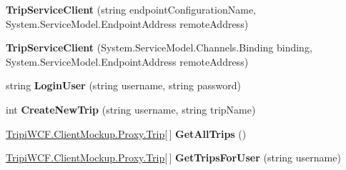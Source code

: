 \begin{DoxyCompactItemize}
\item 
\hypertarget{class_tripi_w_c_f_1_1_client_mockup_1_1_proxy_1_1_trip_service_client_a3d73a69c2c051af7d07455ebd01c553b}{
{\bfseries TripServiceClient} (string endpointConfigurationName, System.ServiceModel.EndpointAddress remoteAddress)}
\label{class_tripi_w_c_f_1_1_client_mockup_1_1_proxy_1_1_trip_service_client_a3d73a69c2c051af7d07455ebd01c553b}

\item 
\hypertarget{class_tripi_w_c_f_1_1_client_mockup_1_1_proxy_1_1_trip_service_client_aba38c5b511e7194f2f1f062e61dee2ba}{
{\bfseries TripServiceClient} (System.ServiceModel.Channels.Binding binding, System.ServiceModel.EndpointAddress remoteAddress)}
\label{class_tripi_w_c_f_1_1_client_mockup_1_1_proxy_1_1_trip_service_client_aba38c5b511e7194f2f1f062e61dee2ba}

\item 
\hypertarget{class_tripi_w_c_f_1_1_client_mockup_1_1_proxy_1_1_trip_service_client_afd416794b12fa01d8d233c26a9b062eb}{
string {\bfseries LoginUser} (string username, string password)}
\label{class_tripi_w_c_f_1_1_client_mockup_1_1_proxy_1_1_trip_service_client_afd416794b12fa01d8d233c26a9b062eb}

\item 
\hypertarget{class_tripi_w_c_f_1_1_client_mockup_1_1_proxy_1_1_trip_service_client_a7400abf4fb78d74521ed353b7ba0c357}{
int {\bfseries CreateNewTrip} (string username, string tripName)}
\label{class_tripi_w_c_f_1_1_client_mockup_1_1_proxy_1_1_trip_service_client_a7400abf4fb78d74521ed353b7ba0c357}

\item 
\hypertarget{class_tripi_w_c_f_1_1_client_mockup_1_1_proxy_1_1_trip_service_client_a8fc3a2887086d08bb0fd3e3e5542e1b5}{
\hyperlink{class_tripi_w_c_f_1_1_client_mockup_1_1_proxy_1_1_trip}{TripiWCF.ClientMockup.Proxy.Trip}\mbox{[}$\,$\mbox{]} {\bfseries GetAllTrips} ()}
\label{class_tripi_w_c_f_1_1_client_mockup_1_1_proxy_1_1_trip_service_client_a8fc3a2887086d08bb0fd3e3e5542e1b5}

\item 
\hypertarget{class_tripi_w_c_f_1_1_client_mockup_1_1_proxy_1_1_trip_service_client_ac2c5cadb252d32d9aec397692f72b262}{
\hyperlink{class_tripi_w_c_f_1_1_client_mockup_1_1_proxy_1_1_trip}{TripiWCF.ClientMockup.Proxy.Trip}\mbox{[}$\,$\mbox{]} {\bfseries GetTripsForUser} (string username)}
\label{class_tripi_w_c_f_1_1_client_mockup_1_1_proxy_1_1_trip_service_client_ac2c5cadb252d32d9aec397692f72b262}


\end{DoxyCompactItemize}
